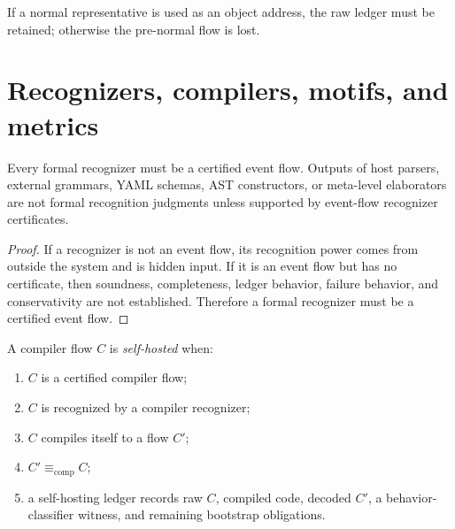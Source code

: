 \begin{corollary}
\label{cor:main-theorems-normal-address-requires-ledger}
If a normal representative is used as an object address, the raw ledger must be retained; otherwise the pre-normal flow is lost.
\end{corollary}

\section{Recognizers, compilers, motifs, and metrics}
\label{sec:main-theorems-recognizers-compilers-motifs-metrics}

\begin{theorem}
\label{thm:main-theorems-recognizer-generatedness}
Every formal recognizer must be a certified event flow. Outputs of host parsers, external grammars, YAML schemas, AST constructors, or meta-level elaborators are not formal recognition judgments unless supported by event-flow recognizer certificates.
\end{theorem}

\begin{proof}
If a recognizer is not an event flow, its recognition power comes from outside the system and is hidden input. If it is an event flow but has no certificate, then soundness, completeness, ledger behavior, failure behavior, and conservativity are not established. Therefore a formal recognizer must be a certified event flow.
\end{proof}

\begin{definition}
\label{def:main-theorems-self-hosted-compiler}
A compiler flow $C$ is \emph{self-hosted} when:
\begin{enumerate}
\item $C$ is a certified compiler flow;
\item $C$ is recognized by a compiler recognizer;
\item $C$ compiles itself to a flow $C'$;
\item $C'\equiv_{\mathrm{comp}}C$;
\item a self-hosting ledger records raw $C$, compiled code, decoded $C'$, a behavior-classifier witness, and remaining bootstrap obligations.
\end{enumerate}
\end{definition}

